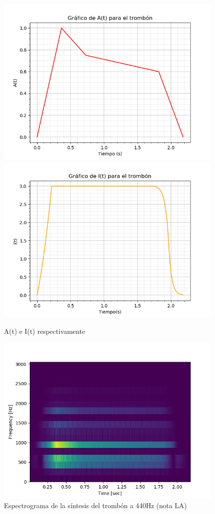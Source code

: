 \documentclass[assd_tp2_main.tex]{subfiles}
\begin{document}
\begin{figure}[H]
\centering
\includegraphics[width=0.4\linewidth]{graficos/EJ4/at_trombon.png}
\includegraphics[width=0.4\linewidth]{graficos/EJ4/it_trombon.png}
\caption{A(t) e I(t) respectivamente}
\label{fig:trombone_envelopes}
\end{figure}

\begin{figure}[H]
\centering
\includegraphics[width=0.4\linewidth]{graficos/EJ4/espectrograma_trombon.png}
\caption{Espectrograma de la síntesis del trombón a 440Hz (nota LA)}
\label{fig:trombone_440}
\end{figure}
\end{document}
